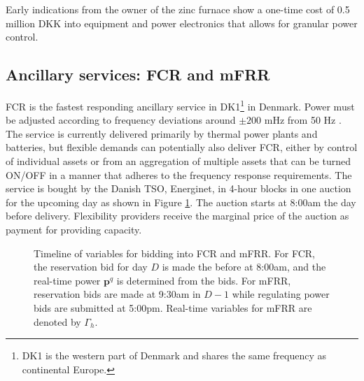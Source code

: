 \documentclass[conference]{IEEEtran}
\begin{document}
Early indications from the owner of the zinc furnace show a one-time cost of 0.5 million DKK into equipment and power electronics that allows for granular power control.

\subsection{Ancillary services: FCR and mFRR}

FCR is the fastest responding ancillary service in DK1\footnote{DK1 is the western part of Denmark and shares the same frequency as continental Europe.} in Denmark. Power must be adjusted according to frequency deviations around $\pm 200$ mHz from 50 Hz \cite{energinet:prequalification}. The service is currently delivered primarily by thermal power plants and batteries, but flexible demands can potentially also deliver FCR, either by control of individual assets or from an aggregation of multiple assets that can be turned ON/OFF in a manner that adheres to the frequency response requirements. The service is bought by the Danish TSO, Energinet, in 4-hour blocks in one auction for the upcoming day as shown in Figure \ref{fig:timeline}. The auction starts at 8:00am the day before delivery. Flexibility providers receive the marginal price of the auction as payment for providing capacity.

\begin{figure}
    \begin{adjustbox}{width=\columnwidth}
        
    \end{adjustbox}
    \caption{Timeline of variables for bidding into FCR and mFRR. For FCR, the reservation bid for day $D$ is made the before at 8:00am, and the real-time power $\bm{p}^{q}$ is determined from the bids. For mFRR, reservation bids are made at 9:30am in $D-1$ while regulating power bids are submitted at 5:00pm. Real-time variables for mFRR are denoted by $\Gamma_{h}$.}
    \label{fig:timeline}
\end{figure}


\end{document}
